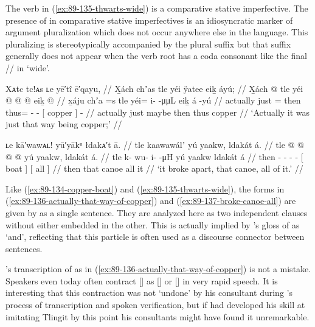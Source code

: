 The verb  in (\ref{ex:89-135-thwarts-wide}) is a comparative stative imperfective.
The presence of  in comparative stative imperfectives is an idiosyncratic marker of argument pluralization which does not occur anywhere else in the language.
This pluralizing  is stereotypically accompanied by the plural suffix  but that suffix generally does not appear when the verb root has a coda consonant like the final  // in  ‘wide’.

\ex\label{ex:89-136-actually-that-way-of-copper}%
%
\begingl
	\glpreamble	Xᴀtc tc!ᴀs ʟe yē′tî ē′qayu, //
	\glpreamble	X̱ách chʼas tle yéi ÿatee eiḵ áyú; //
	\gla	X̱ách  @ {} tle
		yéi @  @ {} @ {}
		{} eiḵ {}  @ {} //
	\glb	x̱áju chʼa =s tle
		yéi= i-  -μμL
		{} eiḵ {} á -yú //
	\glc	actually just = then
		thus= -  -
		{}[ copper {}]  - //
	\gld	actually just \•maybe then thus\•  {} {}
		{} copper {}  {} //
	\glft	‘Actually it was just that way being copper;’
		//
\endgl
\xe

\ex\label{ex:89-137-broke-canoe-all}%
%
\begingl
	\glpreamble	ʟe kā′wawᴀʟ! yū′yākᵘ łdakᴀ′t ā. //
	\glpreamble	tle kaawawálʼ yú yaakw, ldakát á. //
	\gla	tle  @ {} @ {} @ {} @ {}
		{} yú yaakw, {}
		{} ldakát á. {} //
	\glb	tle k- wu- i-  -μH
		{} yú yaakw {}
		{} ldakát á {} //
	\glc	then - - -  -
		{}[  boat {}]
		{}[ all  {}] //
	\gld	then  {} {} {} {}
		{} that canoe {}
		{} all it {} //
	\glft	‘it broke apart, that canoe, all of it.’
		//
\endgl
\xe

Like (\ref{ex:89-134-copper-boat}) and (\ref{ex:89-135-thwarts-wide}), the forms in (\ref{ex:89-136-actually-that-way-of-copper}) and (\ref{ex:89-137-broke-canoe-all}) are given by \citeauthor{swanton:1909} as a single sentence.
They are analyzed here as two independent clauses without either embedded in the other.
This is actually implied by \citeauthor{swanton:1909}’s gloss of  as ‘and’, reflecting that this particle is often used as a discourse connector between sentences.

\citeauthor{swanton:1909}’s transcription of  as  in (\ref{ex:89-136-actually-that-way-of-copper}) is not a mistake.
Speakers even today often contract  [] as  [] or  [] in very rapid speech.
It is interesting that this contraction was not ‘undone’ by his consultant during \citeauthor{swanton:1909}’s process of transcription and spoken verification, but if \citeauthor{swanton:1909} had developed his skill at imitating Tlingit by this point his consultants might have found it unremarkable.

